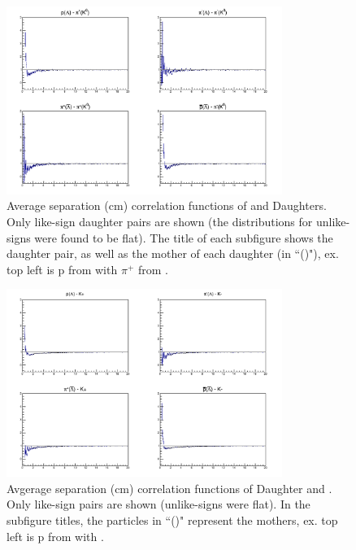 \documentclass[/home/jesse/Analysis/FemtoAnalysis/AnalysisNotes/AnalysisNoteJBuxton.tex]{subfiles}
\begin{document}
\begin{figure}[h]
  \centering
  \includegraphics[width=0.8\textwidth]{3_DataSelection/Figures/AvgSepCFs_LamK0.pdf}
  \caption[Avgerage Separation of \LamALam and \Ks Daughters]{Average separation (cm) correlation functions of \LamALam and \Ks Daughters.  Only like-sign daughter pairs are shown (the distributions for unlike-signs were found to be flat).  The title of each subfigure shows the daughter pair, as well as the mother of each daughter (in ``()"),  ex. top left is p from \Lam with $\pi^{+}$ from \Ks.}
  \label{fig:AvgSepLamK0}
\end{figure}

\begin{figure}[h]
  \centering
  \includegraphics[width=0.8\textwidth]{3_DataSelection/Figures/AvgSepCFs_LamKch.pdf}
  \caption[Avgerage Separation of \LamALam Daughter and \Kpm]{Avgerage separation (cm) correlation functions of \LamALam Daughter and \Kpm.  Only like-sign pairs are shown (unlike-signs were flat).  In the subfigure titles, the particles in ``()" represent the mothers, ex. top left is p from \Lam with \KchP.}
  \label{fig:AvgSepLamKch}
\end{figure}
\end{document}
